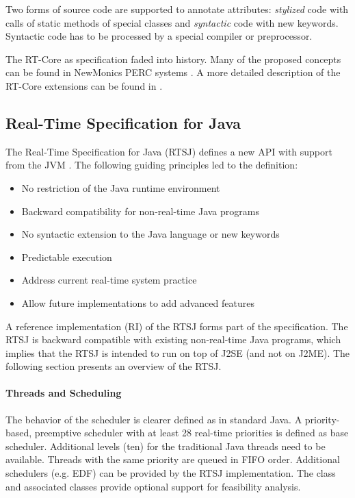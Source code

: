 Two forms of source code are supported to annotate attributes:
\textit{stylized} code with calls of static methods of special
classes and \textit{syntactic} code with new keywords. Syntactic
code has to be processed by a special compiler or preprocessor.

The RT-Core as specification faded into history. Many of the
proposed concepts can be found in NewMonics PERC systems
\cite{PERC}. A more detailed description of the RT-Core extensions
can be found in \cite{jop:rtjava}.

\subsection{Real-Time Specification for Java}
\label{sec:rtsj}

The Real-Time Specification for Java (RTSJ) defines a new API with
support from the JVM \cite{rtsj}. The following guiding principles
led to the definition:
%
\begin{itemize}
    \item No restriction of the Java runtime environment
    \item Backward compatibility for non-real-time Java programs
    \item No syntactic extension to the Java
language or new keywords
    \item Predictable execution
    \item Address current real-time system practice
    \item Allow future implementations to add advanced features
\end{itemize}
%
A reference implementation (RI) of the RTSJ forms part of the
specification. The RTSJ is backward compatible with existing
non-real-time Java programs, which implies that the RTSJ is intended
to run on top of J2SE (and not on J2ME). The following section
presents an overview of the RTSJ.

\paragraph{Threads and Scheduling}

The behavior of the scheduler is clearer defined as in standard
Java. A priority-based, preemptive scheduler with at least 28
real-time priorities is defined as base scheduler. Additional levels
(ten) for the traditional Java threads need to be available. Threads
with the same priority are queued in FIFO order. Additional
schedulers (e.g. EDF) can be provided by the RTSJ implementation.
The class  and associated classes provide optional
support for feasibility analysis.


